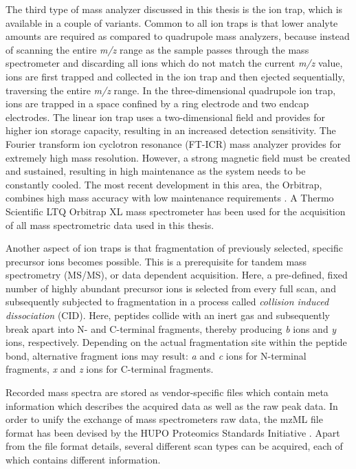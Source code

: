 The third type of mass analyzer discussed in this thesis is the ion trap,
which is available in a couple of variants.
Common to all ion traps is that lower analyte amounts are required as
compared to quadrupole mass analyzers, because instead of scanning
the entire {\em m/z} range as the sample passes through the mass spectrometer 
and discarding all ions which do not match the current {\em m/z} value, 
ions are first trapped and collected in the ion trap and then ejected 
sequentially, traversing the entire {\em m/z} range.
In the three-dimensional quadrupole ion trap, ions are trapped in a space
confined by a ring electrode and two endcap electrodes.
The linear ion trap uses a two-dimensional field and provides for higher ion
storage capacity, resulting in an increased detection sensitivity.
The Fourier transform ion cyclotron resonance (FT-ICR) mass analyzer provides
for extremely high mass resolution.
However, a strong magnetic field must be created and sustained, resulting
in high maintenance as the system needs to be constantly cooled. 
The most recent development in this area, the Orbitrap, combines high mass 
accuracy with low maintenance requirements \citep{Hu2005}. 
A Thermo Scientific LTQ Orbitrap XL mass spectrometer has been used for the
acquisition of all mass spectrometric data used in this thesis.

Another aspect of ion traps is that fragmentation of previously selected,
specific precursor ions becomes possible.
This is a prerequisite for tandem mass spectrometry (MS/MS), or data dependent
acquisition.
Here, a pre-defined, fixed number of highly abundant precursor ions is selected
from every full scan, and subsequently subjected to fragmentation
in a process called {\em collision induced dissociation} (CID).
Here, peptides collide with an inert gas and subsequently break apart into 
N- and C-terminal fragments, thereby producing {\em b} ions and {\em y} ions, 
respectively. 
Depending on the actual fragmentation site within the peptide bond,
alternative fragment ions may result: {\em a} and {\em c} ions for N-terminal
fragments, {\em x} and {\em z} ions for C-terminal fragments.


Recorded mass spectra are stored as vendor-specific files which contain meta 
information which describes the acquired data as well as the raw peak data.
In order to unify the exchange of mass spectrometers raw data, the mzML file 
format has been devised by the HUPO Proteomics Standards Initiative
\citep{Deutsch2008}.
Apart from the file format details, several different scan types can be
acquired, each of which contains different information.

